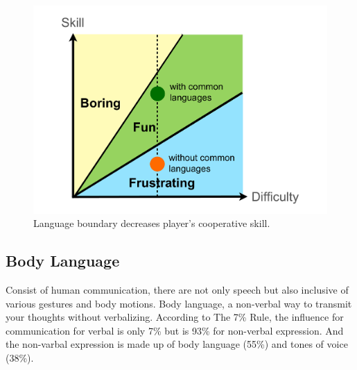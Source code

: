 \begin{figure}[!h]
\centering
\includegraphics[width=0.9\columnwidth]{Figures/GD_F1.pdf}
\caption{Language boundary decreases player's cooperative skill.}
\label{fig:GD_F1}
\end{figure}


\subsection{Body Language}


Consist of human communication, there are not only speech but also inclusive of various gestures and body motions. Body language, a non-verbal way to transmit your thoughts without verbalizing. According to The 7\% Rule\cite{GD2}, the influence for communication for verbal is only 7\% but is 93\% for non-verbal expression. And the non-varbal expression is made up of body language (55\%) and tones of voice (38\%).


